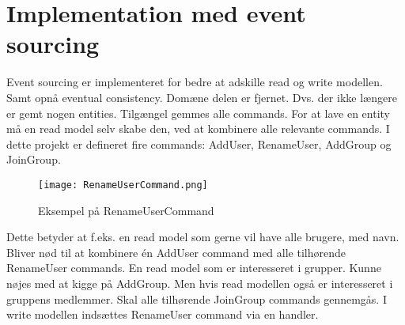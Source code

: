 \section{Implementation med event sourcing}
Event sourcing er implementeret for bedre at adskille read og write modellen. Samt opnå eventual consistency.
Domæne delen er fjernet. Dvs. der ikke længere er gemt nogen entities. Tilgængel gemmes alle commands.
For at lave en entity må en read model selv skabe den, ved at kombinere alle relevante commands.
I dette projekt er defineret fire commands: AddUser, RenameUser, AddGroup og JoinGroup.
\begin{figure}[H]
	\center
	\texttt{[image: RenameUserCommand.png]}
	\caption{Eksempel på RenameUserCommand}
	\label{fig:RenameUserCommandl}
\end{figure}
Dette betyder at f.eks. en read model som gerne vil have alle brugere, med navn. Bliver nød til at kombinere én AddUser command med alle tilhørende RenameUser commands.
En read model som er interesseret i grupper. Kunne nøjes med at kigge på AddGroup. Men hvis read modellen også er interesseret i gruppens medlemmer. Skal alle tilhørende JoinGroup commands gennemgås.
\newline
I write modellen indsættes RenameUser command via en handler.



